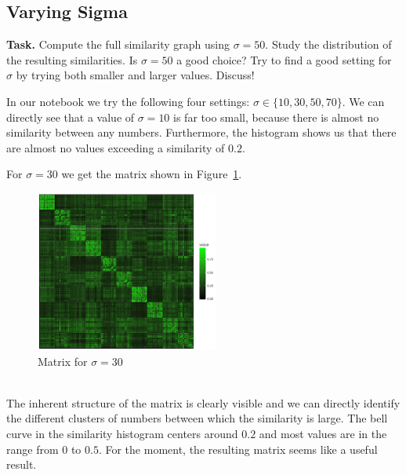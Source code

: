 \documentclass{support/acm_proc_article-sp}
\begin{document}

    \subsection{Varying Sigma}
    \label{subsec:varying-sigma}

    \textbf{Task.} Compute the full similarity graph using $\sigma = 50$.
    Study the distribution of the resulting similarities.
    Is $\sigma = 50$ a good choice?
    Try to find a good setting for $\sigma$ by trying both smaller and larger values.
    Discuss!

    In our notebook we try the following four settings: $\sigma \in \{10, 30, 50, 70\}$.
    We can directly see that a value of $\sigma = 10$ is far too small, because there is almost no similarity between
    any numbers.
    Furthermore, the histogram shows us that there are almost no values exceeding a similarity of $0.2$.

    For $\sigma = 30$ we get the matrix shown in Figure~\ref{fig:2a-s30}.
    \begin{figure}[htbp]
        \centering
        \includegraphics[width=6cm]{images/2a-s30.png}
        \caption{Matrix for $\sigma = 30$}
        \label{fig:2a-s30}
    \end{figure} \\
    The inherent structure of the matrix is clearly visible and we can directly identify the different clusters of numbers
    between which the similarity is large.
    The bell curve in the similarity histogram centers around $0.2$ and most values are in the range from $0$ to $0.5$.
    For the moment, the resulting matrix seems like a useful result.
\end{document}
